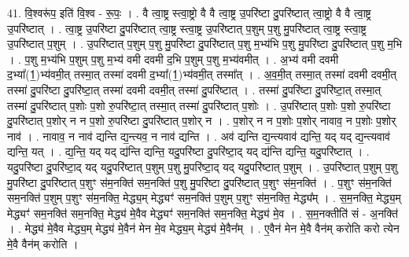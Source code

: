 \documentclass[17pt]{extarticle}
\begin{document}
41. वि॒श्वरू॑प॒ इति॑ वि॒श्व - रू॒पः॒ । . वै त्वा॒ष्ट्र स्त्वा॒ष्ट्रो वै वै त्वा॒ष्ट्र उ॒परि॑ष्टा दु॒परि॑ष्टात् त्वा॒ष्ट्रो वै वै त्वा॒ष्ट्र उ॒परि॑ष्टात् । . त्वा॒ष्ट्र उ॒परि॑ष्टा दु॒परि॑ष्टात् त्वा॒ष्ट्र स्त्वा॒ष्ट्र उ॒परि॑ष्टात् प॒शुम् प॒शु मु॒परि॑ष्टात् त्वा॒ष्ट्र स्त्वा॒ष्ट्र उ॒परि॑ष्टात् प॒शुम् । . उ॒परि॑ष्टात् प॒शुम् प॒शु मु॒परि॑ष्टा दु॒परि॑ष्टात् प॒शु म॒भ्य॑भि प॒शु मु॒परि॑ष्टा दु॒परि॑ष्टात् प॒शु म॒भि । . प॒शु म॒भ्य॑भि प॒शुम् प॒शु म॒भ्य॑ वमी दवमी द॒भि प॒शुम् प॒शु म॒भ्य॑वमीत् । . अ॒भ्य॑ वमी दवमी द॒भ्या᳚(1॒)भ्य॑वमी॒त् तस्मा॒त् तस्मा॑ दवमी द॒भ्या᳚(1॒)भ्य॑वमी॒त् तस्मा᳚त् । . अ॒व॒मी॒त् तस्मा॒त् तस्मा॑ दवमी दवमी॒त् तस्मा॑ दु॒परि॑ष्टा दु॒परि॑ष्टा॒त् तस्मा॑ दवमी दवमी॒त् तस्मा॑ दु॒परि॑ष्टात् । . तस्मा॑ दु॒परि॑ष्टा दु॒परि॑ष्टा॒त् तस्मा॒त् तस्मा॑ दु॒परि॑ष्टात् प॒शोः प॒शो रु॒परि॑ष्टा॒त् तस्मा॒त् तस्मा॑ दु॒परि॑ष्टात् प॒शोः । . उ॒परि॑ष्टात् प॒शोः प॒शो रु॒परि॑ष्टा दु॒परि॑ष्टात् प॒शोर् न न प॒शो रु॒परि॑ष्टा दु॒परि॑ष्टात् प॒शोर् न । . प॒शोर् न न प॒शोः प॒शोर् नावाव॒ न प॒शोः प॒शोर् नाव॑ । . नावाव॒ न नाव॑ द्यन्ति द्य॒न्त्यव॒ न नाव॑ द्यन्ति । . अव॑ द्यन्ति द्य॒न्त्यवाव॑ द्यन्ति॒ यद् यद् द्य॒न्त्यवाव॑ द्यन्ति॒ यत् । . द्य॒न्ति॒ यद् यद् द्य॑न्ति द्यन्ति॒ यदु॒परि॑ष्टा दु॒परि॑ष्टा॒द् यद् द्य॑न्ति द्यन्ति॒ यदु॒परि॑ष्टात् । . यदु॒परि॑ष्टा दु॒परि॑ष्टा॒द् यद् यदु॒परि॑ष्टात् प॒शुम् प॒शु मु॒परि॑ष्टा॒द् यद् यदु॒परि॑ष्टात् प॒शुम् । . उ॒परि॑ष्टात् प॒शुम् प॒शु मु॒परि॑ष्टा दु॒परि॑ष्टात् प॒शुꣳ स॑म॒नक्ति॑ सम॒नक्ति॑ प॒शु मु॒परि॑ष्टा दु॒परि॑ष्टात् प॒शुꣳ स॑म॒नक्ति॑ । . प॒शुꣳ स॑म॒नक्ति॑ सम॒नक्ति॑ प॒शुम् प॒शुꣳ स॑म॒नक्ति॒ मेद्ध्य॒म् मेद्ध्यꣳ॑ सम॒नक्ति॑ प॒शुम् प॒शुꣳ स॑म॒नक्ति॒ मेद्ध्य᳚म् । . स॒म॒नक्ति॒ मेद्ध्य॒म् मेद्ध्यꣳ॑ सम॒नक्ति॑ सम॒नक्ति॒ मेद्ध्य॑ मे॒वैव मेद्ध्यꣳ॑ सम॒नक्ति॑ सम॒नक्ति॒ मेद्ध्य॑ मे॒व । . स॒म॒नक्तीति॑ सं - अ॒नक्ति॑ । . मेद्ध्य॑ मे॒वैव मेद्ध्य॒म् मेद्ध्य॑ मे॒वैन॑ मेन मे॒व मेद्ध्य॒म् मेद्ध्य॑ मे॒वैन᳚म् । . ए॒वैन॑ मेन मे॒वै वैन॑म् करोति करो त्येन मे॒वै वैन॑म् करोति । \newline
\pagebreak
{}
\end{document}
